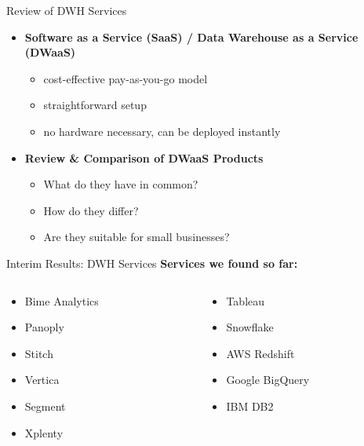 \documentclass[aspectratio=169]{beamer}
\begin{document}
  \begin{frame}{Review of DWH Services}
    \begin{itemize}
      \item \textbf{Software as a Service (SaaS) / Data Warehouse as a Service (DWaaS)}
      	\begin{itemize}
      	   \item cost-effective pay-as-you-go model
           \item straightforward setup
           \item no hardware necessary, can be deployed instantly
      	\end{itemize}
      \item \textbf{Review \& Comparison of DWaaS Products}
        \begin{itemize}
           \item What do they have in common?
      	   \item How do they differ?
      	   \item Are they suitable for small businesses?
      	\end{itemize}
    \end{itemize}
  \end{frame}

  \begin{frame}{Interim Results: DWH Services}
    \textbf{Services we found so far:}

    \begin{columns}
      \begin{column}{0.5\textwidth}
        \begin{itemize}
          \item Bime Analytics
          \item Panoply
          \item Stitch
          \item Vertica
          \item Segment
          \item Xplenty
        \end{itemize}
      \end{column}

      \begin{column}{0.5\textwidth}
        \begin{itemize}
          \item Tableau
          \item Snowflake
          \item AWS Redshift
          \item Google BigQuery
          \item IBM DB2
        \end{itemize}
      \end{column}
    \end{columns}
  \end{frame}
\end{document}
